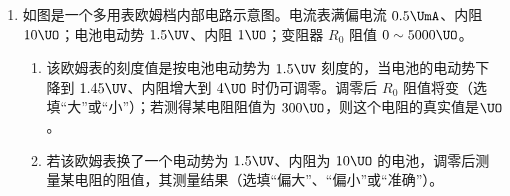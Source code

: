 \documentclass[\gkver]{gaokaozhenti}
\begin{document}
\begin{enumerate}
\begin{enumerate}
	\item
	（单选题）实验时，将磁传感器探管前端插至通电螺线管轴线中点时，磁传感器读数为 $5\UmT$。减小通电螺线管的电流后，将探管从螺线管的另一端插入，当探管前端再次到达螺线管轴线中点时，磁传感器的读数可能为

	\fourchoices[answer=D]
	{$5\UmT$}
	{$-5\UmT$}
	{$3\UmT$}
	{$-3\UmT$}
\end{enumerate}

\item
如图是一个多用表欧姆档内部电路示意图。电流表满偏电流 $0.5\UmA$、内阻 $10\UO$；电池电动势 $1.5\UV$、内阻 $1\UO$；变阻器 $R_{0}$ 阻值 $0\sim5000\UO$。
\begin{enumerate}
	\item
	该欧姆表的刻度值是按电池电动势为 $1.5\UV$ 刻度的，当电池的电动势下降到 $1.45\UV$、内阻增大到 $4\UO$ 时仍可调零。调零后 $R_{0}$ 阻值将变（选填“大”或“小”）；若测得某电阻阻值为 $300\UO$，则这个电阻的真实值是$\UO$。

	\item
	若该欧姆表换了一个电动势为 $1.5\UV$、内阻为 $10\UO$ 的电池，调零后测量某电阻的阻值，其测量结果（选填“偏大”、“偏小”或“准确”）。
\end{enumerate}

\onepicture[align=right, h=3.53cm]{}
\end{enumerate}
\end{document}
